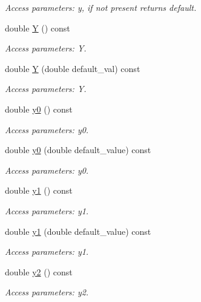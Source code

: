 \begin{DoxyCompactItemize}
\begin{DoxyCompactList}\small\item\em Access parameters\+: y, if not present returns default. \end{DoxyCompactList}\item 
double \hyperlink{struct_d_d4hep_1_1_x_m_l_1_1_dimension_acb0608c278e40e3a2d27f77e86cd7326}{Y} () const
\begin{DoxyCompactList}\small\item\em Access parameters\+: Y. \end{DoxyCompactList}\item 
double \hyperlink{struct_d_d4hep_1_1_x_m_l_1_1_dimension_afaec9ec83a4df1d7edd0c2501ab6264f}{Y} (double default\+\_\+val) const
\begin{DoxyCompactList}\small\item\em Access parameters\+: Y. \end{DoxyCompactList}\item 
double \hyperlink{struct_d_d4hep_1_1_x_m_l_1_1_dimension_afe682ea84e24c347abd81bdf71c11085}{y0} () const
\begin{DoxyCompactList}\small\item\em Access parameters\+: y0. \end{DoxyCompactList}\item 
double \hyperlink{struct_d_d4hep_1_1_x_m_l_1_1_dimension_af356f83ce219b272fbad1d349d65f0ea}{y0} (double default\+\_\+value) const
\begin{DoxyCompactList}\small\item\em Access parameters\+: y0. \end{DoxyCompactList}\item 
double \hyperlink{struct_d_d4hep_1_1_x_m_l_1_1_dimension_a59a29570af0574b18541f49f2819f465}{y1} () const
\begin{DoxyCompactList}\small\item\em Access parameters\+: y1. \end{DoxyCompactList}\item 
double \hyperlink{struct_d_d4hep_1_1_x_m_l_1_1_dimension_a3d65ac8382a31ccb66264c785022d4da}{y1} (double default\+\_\+value) const
\begin{DoxyCompactList}\small\item\em Access parameters\+: y1. \end{DoxyCompactList}\item 
double \hyperlink{struct_d_d4hep_1_1_x_m_l_1_1_dimension_abef27bfc3bcb2795c63ba10894f970e7}{y2} () const
\begin{DoxyCompactList}\small\item\em Access parameters\+: y2. \end{DoxyCompactList}\item 

\end{DoxyCompactItemize}
